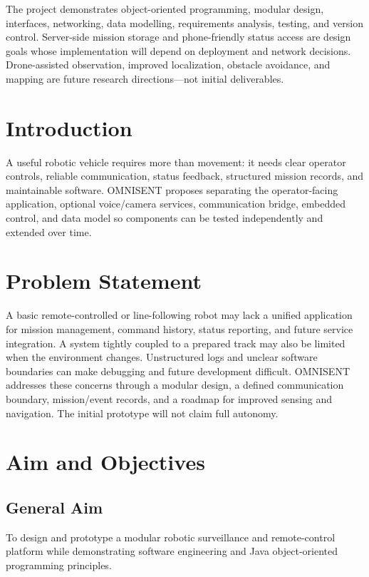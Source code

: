 \documentclass[12pt,a4paper]{article}
\begin{document}
The project demonstrates object-oriented programming, modular design, interfaces, networking, data modelling, requirements analysis, testing, and version control. Server-side mission storage and phone-friendly status access are design goals whose implementation will depend on deployment and network decisions. Drone-assisted observation, improved localization, obstacle avoidance, and mapping are future research directions—not initial deliverables.

\section{Introduction}
A useful robotic vehicle requires more than movement: it needs clear operator controls, reliable communication, status feedback, structured mission records, and maintainable software. OMNISENT proposes separating the operator-facing application, optional voice/camera services, communication bridge, embedded control, and data model so components can be tested independently and extended over time.

\section{Problem Statement}
A basic remote-controlled or line-following robot may lack a unified application for mission management, command history, status reporting, and future service integration. A system tightly coupled to a prepared track may also be limited when the environment changes. Unstructured logs and unclear software boundaries can make debugging and future development difficult. OMNISENT addresses these concerns through a modular design, a defined communication boundary, mission/event records, and a roadmap for improved sensing and navigation. The initial prototype will not claim full autonomy.

\section{Aim and Objectives}
\subsection{General Aim}
To design and prototype a modular robotic surveillance and remote-control platform while demonstrating software engineering and Java object-oriented programming principles.
\end{document}
